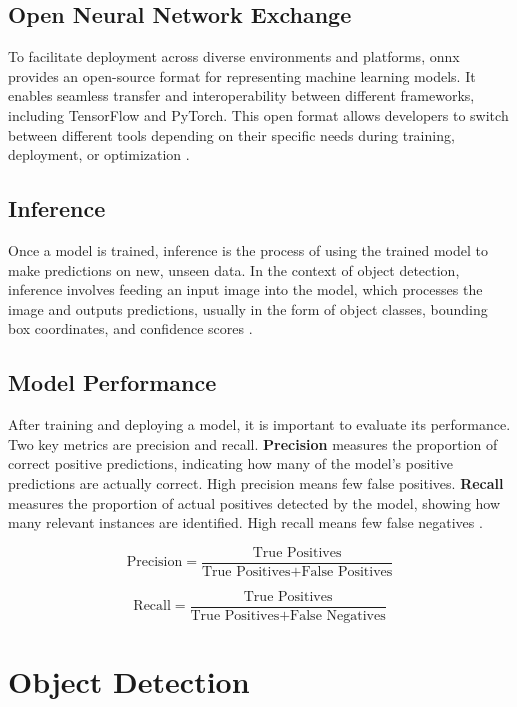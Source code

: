 \subsection{Open Neural Network Exchange}

To facilitate deployment across diverse environments and platforms, \gls{onnx} provides an open-source format for representing machine learning models. It enables seamless transfer and interoperability between different frameworks, including TensorFlow and PyTorch. This open format allows developers to switch between different tools depending on their specific needs during training, deployment, or optimization \cite{roboflow:onnx}.\\

\subsection{Inference}

Once a model is trained, inference is the process of using the trained model to make predictions on new, unseen data. In the context of object detection, inference involves feeding an input image into the model, which processes the image and outputs predictions, usually in the form of object classes, bounding box coordinates, and confidence scores \cite{nvidia:inference}. \\

\newpage

\subsection{Model Performance}

After training and deploying a model, it is important to evaluate its performance. Two key metrics are precision and recall. \textbf{Precision} measures the proportion of correct positive predictions, indicating how many of the model’s positive predictions are actually correct. High precision means few false positives. \textbf{Recall} measures the proportion of actual positives detected by the model, showing how many relevant instances are identified. High recall means few false negatives \cite{builtin:precision-recall}.

\[
\text{Precision} = \frac{\text{True Positives}}{\text{True Positives} + \text{False Positives}}
\]

\[
\text{Recall} = \frac{\text{True Positives}}{\text{True Positives} + \text{False Negatives}}
\]

\section{Object Detection}
\label{sec:object-detection}

